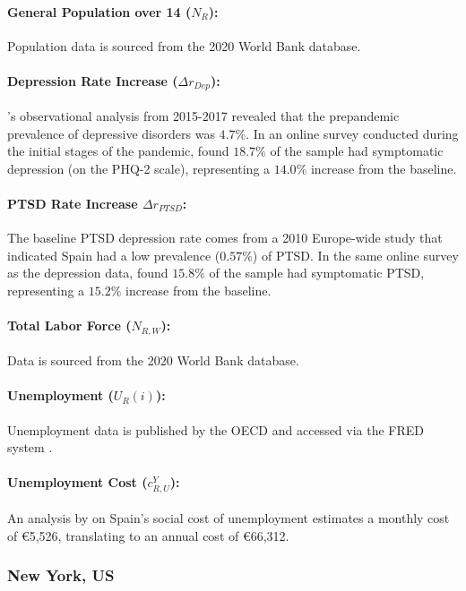 \documentclass[msom,blindrev]{informs3} %
\begin{document}
\begin{APPENDICES}
\paragraph{General Population over 14 ($N_{R}$):} Population data is sourced from the 2020 World Bank database.
\paragraph{Depression Rate Increase ($\Delta r_{Dep}$):} 's observational analysis from 2015-2017 revealed that the prepandemic prevalence of depressive disorders was $4.7\%$. In an online survey conducted during the initial stages of the pandemic,  found $18.7\%$ of the sample had symptomatic depression (on the PHQ-2 scale), representing a $14.0\%$ increase from the baseline. 


\paragraph{PTSD Rate Increase $\Delta r_{PTSD}$:} The baseline PTSD depression rate comes from a 2010 Europe-wide study  that indicated Spain had a low prevalence ($0.57\%$) of PTSD. In the same online survey as the depression data,  found $15.8\%$ of the sample had symptomatic PTSD, representing a $15.2\%$ increase from the baseline. 
\paragraph{Total Labor Force ($N_{R,W}$):} Data is sourced from the 2020 World Bank database.

\paragraph{Unemployment ($U_R(i)$):} Unemployment data is published by the OECD and accessed via the FRED system .

\paragraph{Unemployment Cost ($c^Y_{R,U}$):} An analysis by  on Spain’s social cost of unemployment estimates a monthly cost of \euro5,526, translating to an annual cost of \euro66,312.

\subsubsection{New York, US}


\end{APPENDICES}
\end{document}
